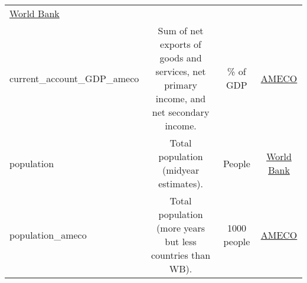 \documentclass[]{article}
\begin{document}
\begin{longtable}[]{@{}lccc@{}}
\begin{minipage}[t]{0.15\columnwidth}
\href{https://data.worldbank.org/indicator/BN.CAB.XOKA.GD.ZS}{World
Bank}\strut
\end{minipage}\tabularnewline
\begin{minipage}[t]{0.14\columnwidth}\raggedright\strut
current\_account\_GDP\_ameco\strut
\end{minipage} & \begin{minipage}[t]{0.36\columnwidth}\centering\strut
Sum of net exports of goods and services, net primary income, and net
secondary income.\strut
\end{minipage} & \begin{minipage}[t]{0.24\columnwidth}\centering\strut
\% of GDP\strut
\end{minipage} & \begin{minipage}[t]{0.15\columnwidth}\centering\strut
\href{https://ec.europa.eu/info/business-economy-euro/indicators-statistics/economic-databases/macro-economic-database-ameco/download-annual-data-set-macro-economic-database-ameco_en}{AMECO}\strut
\end{minipage}\tabularnewline
\begin{minipage}[t]{0.14\columnwidth}\raggedright\strut
population\strut
\end{minipage} & \begin{minipage}[t]{0.36\columnwidth}\centering\strut
Total population (midyear estimates).\strut
\end{minipage} & \begin{minipage}[t]{0.24\columnwidth}\centering\strut
People\strut
\end{minipage} & \begin{minipage}[t]{0.15\columnwidth}\centering\strut
\href{https://data.worldbank.org/indicator/SP.POP.TOTL}{World
Bank}\strut
\end{minipage}\tabularnewline
\begin{minipage}[t]{0.14\columnwidth}\raggedright\strut
population\_ameco\strut
\end{minipage} & \begin{minipage}[t]{0.36\columnwidth}\centering\strut
Total population (more years but less countries than WB).\strut
\end{minipage} & \begin{minipage}[t]{0.24\columnwidth}\centering\strut
1000 people\strut
\end{minipage} & \begin{minipage}[t]{0.15\columnwidth}\centering\strut
\href{https://ec.europa.eu/info/business-economy-euro/indicators-statistics/economic-databases/macro-economic-database-ameco/download-annual-data-set-macro-economic-database-ameco_en}{AMECO}\strut

\end{minipage}
\end{longtable}
\end{document}
